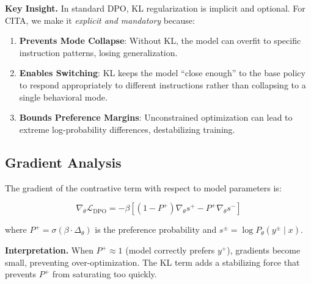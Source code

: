 \textbf{Key Insight.} In standard DPO, KL regularization is implicit and optional. For CITA, we make it \textit{explicit and mandatory} because:

\begin{enumerate}[leftmargin=*,itemsep=2pt]
    \item \textbf{Prevents Mode Collapse}: Without KL, the model can overfit to specific instruction patterns, losing generalization.

    \item \textbf{Enables Switching}: KL keeps the model ``close enough'' to the base policy to respond appropriately to different instructions rather than collapsing to a single behavioral mode.

    \item \textbf{Bounds Preference Margins}: Unconstrained optimization can lead to extreme log-probability differences, destabilizing training.
\end{enumerate}

\vspace{-2mm}
\subsection{Gradient Analysis}
\label{sec:gradient}

The gradient of the contrastive term with respect to model parameters is:

\begin{equation}
\nabla_\theta \mathcal{L}_{\text{DPO}} = -\beta \left[ (1 - P^+) \nabla_\theta s^+ - P^+ \nabla_\theta s^- \right]
\label{eq:gradient}
\end{equation}

where $P^+ = \sigma(\beta \cdot \Delta_\theta)$ is the preference probability and $s^{\pm} = \log P_\theta(y^{\pm} \mid x)$.

\textbf{Interpretation.} When $P^+ \approx 1$ (model correctly prefers $y^+$), gradients become small, preventing over-optimization. The KL term adds a stabilizing force that prevents $P^+$ from saturating too quickly.
